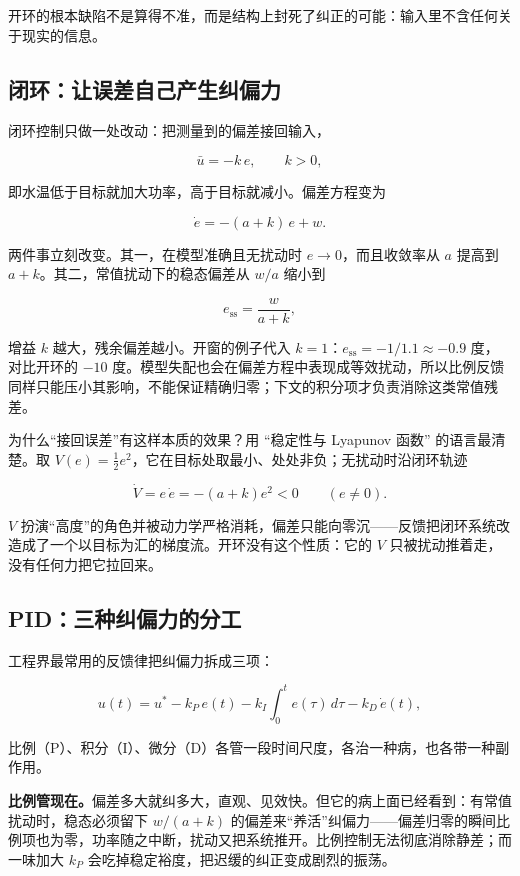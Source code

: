开环的根本缺陷不是算得不准，而是结构上封死了纠正的可能：输入里不含任何关于现实的信息。

\subsection{闭环：让误差自己产生纠偏力}

闭环控制只做一处改动：把测量到的偏差接回输入，

\[
\bar u=-k\,e,\qquad k>0,
\]

即水温低于目标就加大功率，高于目标就减小。偏差方程变为

\[
\dot e=-(a+k)\,e+w.
\]

两件事立刻改变。其一，在模型准确且无扰动时 \(e\to0\)，而且收敛率从 \(a\) 提高到 \(a+k\)。其二，常值扰动下的稳态偏差从 \(w/a\) 缩小到

\[
e_{\mathrm{ss}}=\frac{w}{a+k},
\]

增益 \(k\) 越大，残余偏差越小。开窗的例子代入 \(k=1\)：\(e_{\mathrm{ss}}=-1/1.1\approx-0.9\) 度，对比开环的 \(-10\) 度。模型失配也会在偏差方程中表现成等效扰动，所以比例反馈同样只能压小其影响，不能保证精确归零；下文的积分项才负责消除这类常值残差。

为什么``接回误差''有这样本质的效果？用 ``稳定性与 Lyapunov 函数'' 的语言最清楚。取 \(V(e)=\tfrac12 e^2\)，它在目标处取最小、处处非负；无扰动时沿闭环轨迹

\[
\dot V=e\,\dot e=-(a+k)e^2<0
\qquad(e\ne0).
\]

\(V\) 扮演``高度''的角色并被动力学严格消耗，偏差只能向零沉——反馈把闭环系统改造成了一个以目标为汇的梯度流。开环没有这个性质：它的 \(V\) 只被扰动推着走，没有任何力把它拉回来。

\subsection{PID：三种纠偏力的分工}

工程界最常用的反馈律把纠偏力拆成三项：

\[
u(t)=u^\ast-k_P\,e(t)-k_I\int_0^t e(\tau)\,d\tau-k_D\,\dot e(t),
\]

比例（P）、积分（I）、微分（D）各管一段时间尺度，各治一种病，也各带一种副作用。

\textbf{比例管现在。}偏差多大就纠多大，直观、见效快。但它的病上面已经看到：有常值扰动时，稳态必须留下 \(w/(a+k)\) 的偏差来``养活''纠偏力——偏差归零的瞬间比例项也为零，功率随之中断，扰动又把系统推开。比例控制无法彻底消除静差；而一味加大 \(k_P\) 会吃掉稳定裕度，把迟缓的纠正变成剧烈的振荡。

